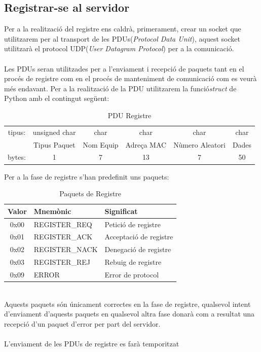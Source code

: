\documentclass[11pt]{article}
\begin{document}
\subsection{Registrar-se al servidor}
Per a la realització del registre ens caldrà, primerament, crear un socket que utilitzarem per al transport de les PDUs(\textit{Protocol Data Unit}), aquest socket utilitzarà el protocol UDP(\textit{User Datagram Protocol}) per a la comunicació.
\\\\
Les PDUs seran utilitzades per a l'enviament i recepció de paquets tant en el procés de registre com en el procés de manteniment de comunicació com es veurà més endavant. Per a la realització de la PDU utilitzarem la funció\textit{struct} de Python amb el contingut següent:
\begin{table}[h]

\def\arraystretch{1.5}
\begin{tabular}{ c c c c c c}
tipus: & unsigned char & char &  char & char & char\\
\cline{2-6}
& \multicolumn{1}{|c|}{Tipus Paquet} & \multicolumn{1}{|c|}{Nom Equip} & \multicolumn{1}{|c|}{Adreça MAC} & \multicolumn{1}{|c|}{Nùmero Aleatori} & \multicolumn{1}{|c|}{Dades}\\
\cline{2-6}
bytes: & 1 & 7 & 13 & 7 & 50
	\end{tabular}
	\caption{PDU Registre}
	\label{tab:PDUReg}
\end{table}
\newpage
Per a la fase de registre s'han predefinit uns paquets:\\
\begin{table}[h]
\centering
\def\arraystretch{1.5}
\begin{tabular}{ c l l }
\hline
Valor & Mnemònic & Significat\\
\hline
\hline
0x00 & REGISTER\_REQ & Petició de registre\\
0x01 & REGISTER\_ACK & Acceptació de registre\\
0x02 & REGISTER\_NACK & Denegació de registre\\
0x03 & REGISTER\_REJ & Rebuig de registre\\
0x09 & ERROR & Error de protocol\\
\hline
	\end{tabular}
	\caption{Paquets de Registre}
	\label{tab:PaquetsRegistre}
\end{table}
\\
Aquests paquets són únicament correctes en la fase de registre, qualsevol intent d'enviament d'aquests paquets en qualsevol altra fase donarà com a resultat una recepció d'un paquet d'error per part del servidor.
\\\\
L'enviament de les PDUs de registre es farà temporitzat
\end{document}
